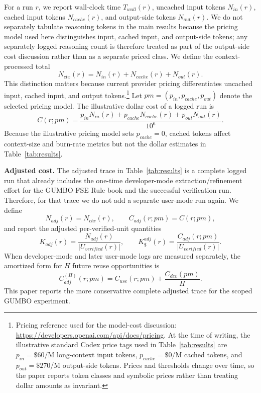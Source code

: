 \documentclass[conference]{IEEEtran}
\begin{document}
For a run $r$, we report wall-clock time $T_{wall}(r)$, uncached input tokens $N_{in}(r)$, cached input tokens $N_{cache}(r)$, and output-side tokens $N_{out}(r)$. We do not separately tabulate reasoning tokens in the main results because the pricing model used here distinguishes input, cached input, and output-side tokens; any separately logged reasoning count is therefore treated as part of the output-side cost discussion rather than as a separate priced class. We define the context-processed total
\begin{equation}
N_{ctx}(r)=N_{in}(r)+N_{cache}(r)+N_{out}(r).
\end{equation}
This distinction matters because current provider pricing differentiates uncached input, cached input, and output tokens.\footnote{Pricing reference used for the model-cost discussion: \url{https://developers.openai.com/api/docs/pricing}. At the time of writing, the illustrative standard Codex price tags used in Table~\ref{tab:results} are $p_{in}=\$60$/M long-context input tokens, $p_{cache}=\$0$/M cached tokens, and $p_{out}=\$270$/M output-side tokens. Prices and thresholds change over time, so the paper reports token classes and symbolic prices rather than treating dollar amounts as invariant.} Let $pm=(p_{in},p_{cache},p_{out})$ denote the selected pricing model. The illustrative dollar cost of a logged run is
\begin{equation}
C(r;pm)=\frac{p_{in}N_{in}(r)+p_{cache}N_{cache}(r)+p_{out}N_{out}(r)}{10^{6}}.
\end{equation}
Because the illustrative pricing model sets $p_{cache}=0$, cached tokens affect context-size and burn-rate metrics but not the dollar estimates in Table~\ref{tab:results}.

\noindent\textbf{Adjusted cost.}
The adjusted trace in Table~\ref{tab:results} is a complete logged run that already includes the one-time developer-mode extraction/refinement effort for the GUMBO FSE Rule book and the successful verification run. Therefore, for that trace we do not add a separate user-mode run again. We define
\begin{equation}
N_{adj}(r)=N_{ctx}(r), \qquad C_{adj}(r;pm)=C(r;pm),
\end{equation}
and report the adjusted per-verified-unit quantities
\begin{equation}
K_{adj}(r)=\frac{N_{adj}(r)}{|U_{verified}(r)|}, \qquad
K_{\$}^{adj}(r)=\frac{C_{adj}(r;pm)}{|U_{verified}(r)|}.
\end{equation}
When developer-mode and later user-mode logs are measured separately, the amortized form for $H$ future reuse opportunities is
\begin{equation}
C_{adj}^{(H)}(r;pm)=C_{use}(r;pm)+\frac{C_{dev}(pm)}{H}.
\end{equation}
This paper reports the more conservative complete adjusted trace for the scoped GUMBO experiment.
\end{document}
